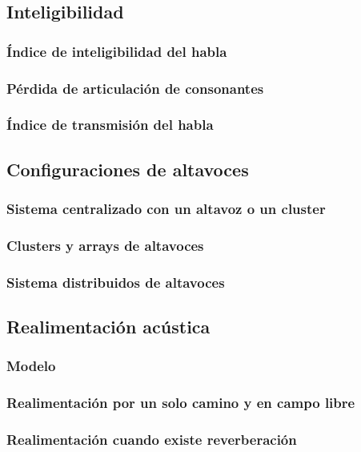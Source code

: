 \documentclass[a4paper, 8pt]{extarticle}
\begin{document}
\begin{multicols}{3}
  \subsection{Inteligibilidad}
  \subsubsection{Índice de inteligibilidad del habla}
  \subsubsection{Pérdida de articulación de consonantes}
  \subsubsection{Índice de transmisión del habla}

  \subsection{Configuraciones de altavoces}
  \subsubsection{Sistema centralizado con un altavoz o un cluster}
  \subsubsection{Clusters y arrays de altavoces}
  \subsubsection{Sistema distribuidos de altavoces}

  \subsection{Realimentación acústica}
  \subsubsection{Modelo}
  \subsubsection{Realimentación por un solo camino y en campo libre}
  \subsubsection{Realimentación cuando existe reverberación}

\end{multicols}
\end{document}
